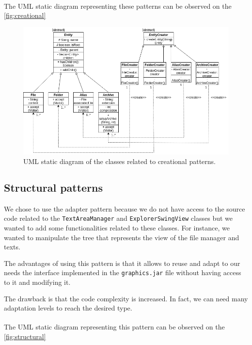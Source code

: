 \documentclass[a4paper, 11pt, oneside]{article}
\begin{document}
\paragraph{}The UML static diagram representing these patterns can be observed on the \autoref{fig:creational}

\begin{figure}[!ht]
    \centering
    \includegraphics[scale=0.6]{creationnal.png}
    \caption{UML static diagram of the classes related to creational patterns.}\label{fig:creational}
\end{figure}

\subsection{Structural patterns}

\paragraph{}We chose to use the adapter pattern because we do not have access to the source code related to the \texttt{TextAreaManager} and \texttt{ExplorerSwingView} classes but we wanted to add some functionalities related to these classes. For instance, we wanted to manipulate the tree that represents the view of the file manager and texts.

The advantages of using this pattern is that it allows to reuse and adapt to our needs the interface implemented in the \texttt{graphics.jar} file without having access to it and modifying it.

The drawback is that the code complexity is increased. In fact, we can need many adaptation levels to reach the desired type. 

\paragraph{}The UML static diagram representing this pattern can be observed on the \autoref{fig:structural}
\end{document}
